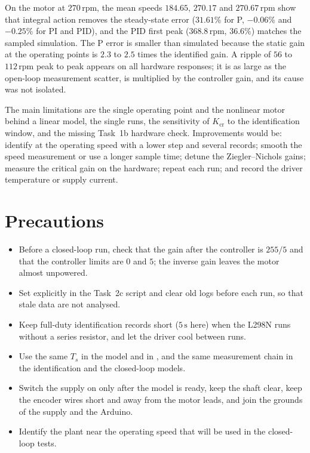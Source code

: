 \documentclass[lettersize,journal]{IEEEtran}
\newcommand{\code}[1]{\texttt{\detokenize{#1}}}
\newcommand{\Ts}{T_{\!s}}
\newcommand{\Kcr}{K_{\mathrm{cr}}}
\newcommand{\rpm}{\,\text{rpm}}
\begin{document}
On the motor at $270\rpm$, the mean speeds $184.65$, $270.17$ and $270.67\rpm$ show that integral action removes the steady-state error ($31.61\%$ for P, $-0.06\%$ and $-0.25\%$ for PI and PID), and the PID first peak ($368.8\rpm$, $36.6\%$) matches the sampled simulation. The P error is smaller than simulated because the static gain at the operating points is $2.3$ to $2.5$ times the identified gain. A ripple of $56$ to $112\rpm$ peak to peak appears on all hardware responses; it is as large as the open-loop measurement scatter, is multiplied by the controller gain, and its cause was not isolated.

The main limitations are the single operating point and the nonlinear motor behind a linear model, the single runs, the sensitivity of $\Kcr$ to the identification window, and the missing Task~1b hardware check. Improvements would be: identify at the operating speed with a lower step and several records; smooth the speed measurement or use a longer sample time; detune the Ziegler--Nichols gains; measure the critical gain on the hardware; repeat each run; and record the driver temperature or supply current.

\section{Precautions}
\begin{itemize}
\item Before a closed-loop run, check that the gain after the controller is $255/5$ and that the controller limits are $0$ and $5$; the inverse gain leaves the motor almost unpowered.
\item Set \code{MODE} explicitly in the Task~2c script and clear old logs before each run, so that stale data are not analysed.
\item Keep full-duty identification records short ($5\,\text{s}$ here) when the L298N runs without a series resistor, and let the driver cool between runs.
\item Use the same $\Ts$ in the model and in \code{iddata}, and the same measurement chain in the identification and the closed-loop models.
\item Switch the supply on only after the model is ready, keep the shaft clear, keep the encoder wires short and away from the motor leads, and join the grounds of the supply and the Arduino.
\item Identify the plant near the operating speed that will be used in the closed-loop tests.
\end{itemize}
\end{document}
